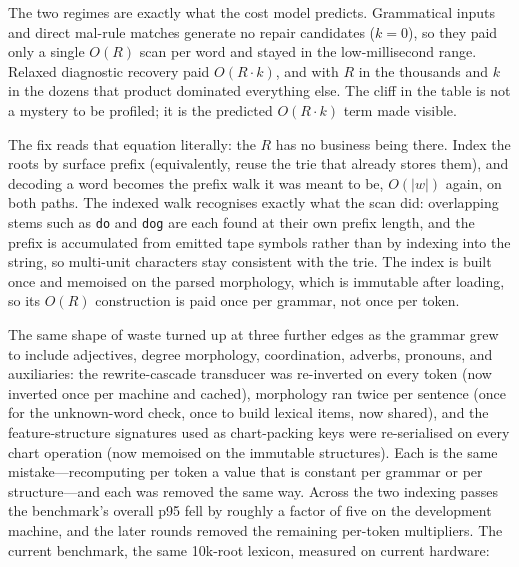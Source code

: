 \documentclass[11pt]{article}
\theoremstyle{definition}
\theoremstyle{plain}
\theoremstyle{remark}
\begin{document}
The two regimes are exactly what the cost model predicts. Grammatical inputs and
direct mal-rule matches generate no repair candidates ($k=0$), so they paid only a
single $O(R)$ scan per word and stayed in the low-millisecond range. Relaxed
diagnostic recovery paid $O(R\cdot k)$, and with $R$ in the thousands and $k$ in
the dozens that product dominated everything else. The cliff in the table is not a
mystery to be profiled; it is the predicted $O(R\cdot k)$ term made visible.

The fix reads that equation literally: the $R$ has no business being there. Index
the roots by surface prefix (equivalently, reuse the trie that already stores
them), and decoding a word becomes the prefix walk it was meant to be, $O(|w|)$
again, on both paths. The indexed walk recognises exactly what the scan did:
overlapping stems such as \texttt{do} and \texttt{dog} are each found at their own
prefix length, and the prefix is accumulated from emitted tape symbols rather than
by indexing into the string, so multi-unit characters stay consistent with the
trie. The index is built once and memoised on the parsed morphology, which is
immutable after loading, so its $O(R)$ construction is paid once per grammar, not
once per token.

The same shape of waste turned up at three further edges as the grammar grew to
include adjectives, degree morphology, coordination, adverbs, pronouns, and
auxiliaries: the rewrite-cascade transducer was re-inverted on every token (now
inverted once per machine and cached), morphology ran twice per sentence (once for
the unknown-word check, once to build lexical items, now shared), and the
feature-structure signatures used as chart-packing keys were re-serialised on every
chart operation (now memoised on the immutable structures). Each is the same
mistake---recomputing per token a value that is constant per grammar or per
structure---and each was removed the same way. Across the two indexing passes the
benchmark's overall p95 fell by roughly a factor of five on the development machine,
and the later rounds removed the remaining per-token multipliers. The current
benchmark, the same 10k-root lexicon, measured on current hardware:
\end{document}
